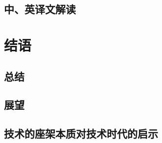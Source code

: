 \documentclass{article}
\begin{document}
	\subsection{中、英译文解读}
\section{结语}
	\subsection{总结}
	\subsection{展望}
	\subsection{技术的座架本质对技术时代的启示}
\renewcommand\refname{参考文献}


\end{document}
